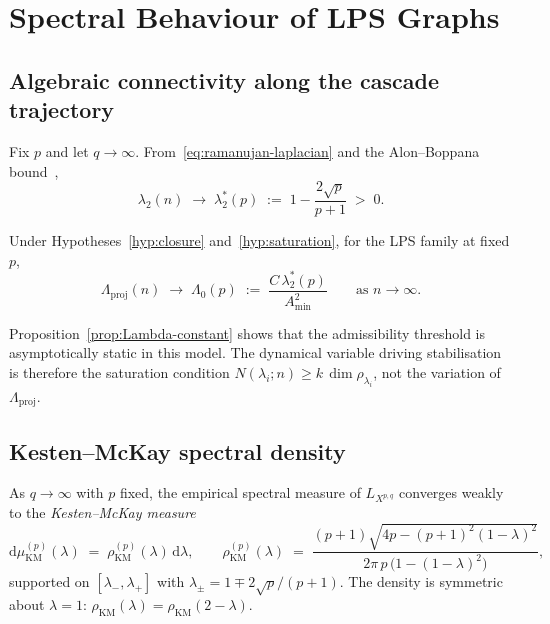 \section{Spectral Behaviour of LPS Graphs}
  \label{sec:spectral}

  \subsection{Algebraic connectivity along the cascade trajectory}
    \label{sec:spectral:lambda2}

    Fix $p$ and let $q \to \infty$.
    From~\eqref{eq:ramanujan-laplacian} and the Alon--Boppana
    bound~\cite{Alon1986},
    \begin{equation}
      \label{eq:lambda2-limit}
      \lambda_2(n) \;\longrightarrow\; \lambda_2^*(p)
      \;:=\; 1 - \frac{2\sqrt{p}}{p+1} \;>\; 0.
    \end{equation}

    \begin{proposition}
      \label{prop:Lambda-constant}
      Under Hypotheses~\ref{hyp:closure} and~\ref{hyp:saturation}, for the LPS
      family at fixed $p$,
      \begin{equation}
        \label{eq:Lambda-constant}
        \Lambda_{\mathrm{proj}}(n) \;\longrightarrow\; \Lambda_0(p)
        \;:=\; \frac{C\,\lambda_2^*(p)}{A_{\min}^2}
        \qquad \text{as } n \to \infty.
      \end{equation}
    \end{proposition}

    \noindent
    Proposition~\ref{prop:Lambda-constant} shows that the admissibility threshold
    is asymptotically static in this model.
    The dynamical variable driving stabilisation is therefore the saturation
    condition $N(\lambda_i; n) \geq k\,\dim\rho_{\lambda_i}$, not the variation
    of $\Lambda_{\mathrm{proj}}$.

  \subsection{Kesten--McKay spectral density}
    \label{sec:spectral:kesten}

    As $q \to \infty$ with $p$ fixed, the empirical spectral measure of
    $L_{X^{p,q}}$ converges weakly to the \emph{Kesten--McKay
measure}~\cite{McKay1981,Kesten1959}
    \begin{equation}
      \label{eq:kesten-mckay}
      \mathrm{d}\mu_{\mathrm{KM}}^{(p)}(\lambda)
      \;=\; \rho_{\mathrm{KM}}^{(p)}(\lambda)\,\mathrm{d}\lambda,
      \qquad
      \rho_{\mathrm{KM}}^{(p)}(\lambda)
      \;=\; \frac{(p+1)\sqrt{4p - (p+1)^2(1-\lambda)^2}}
      {2\pi\,p\,\bigl(1 - (1-\lambda)^2\bigr)},
    \end{equation}
    supported on $[\lambda_-, \lambda_+]$ with
    $\lambda_\pm = 1 \mp 2\sqrt{p}/(p+1)$.
    The density is symmetric about $\lambda = 1$:
    $\rho_{\mathrm{KM}}(\lambda) = \rho_{\mathrm{KM}}(2 - \lambda)$.

